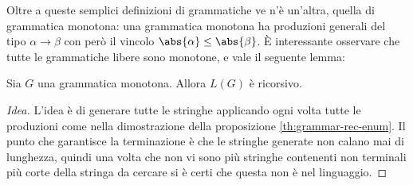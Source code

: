 \documentclass[12pt]{article}
\numberwithin{theorem}{subsection}
\begin{document}
Oltre a queste semplici definizioni di grammatiche ve n'è un'altra, quella di grammatica monotona: una grammatica monotona ha produzioni generali del tipo $\alpha \rightarrow \beta$ con però il vincolo $\abs{\alpha} \le \abs{\beta}$.
È interessante osservare che tutte le grammatiche libere sono monotone, e vale il seguente lemma:
\begin{lemma}
	Sia $G$ una grammatica monotona. Allora $L(G)$ è ricorsivo.
\end{lemma}
\begin{proof}[Idea]
	L'idea è di generare tutte le stringhe applicando ogni volta tutte le produzioni come nella dimostrazione della proposizione \ref{th:grammar-rec-enum}. Il punto che garantisce la terminazione è che le stringhe generate non calano mai di lunghezza, quindi una volta che non vi sono più stringhe contenenti non terminali più corte della stringa da cercare si è certi che questa non è nel linguaggio.
\end{proof}
%
%
%	
%	
\end{document}
